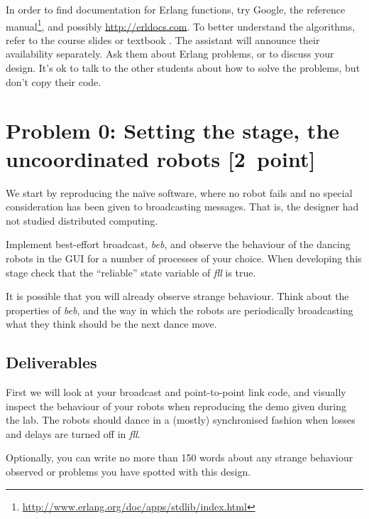 \documentclass[a4paper]{article}
\begin{document}
In order to find documentation for Erlang functions, try Google, the reference
manual\footnote{\url{http://www.erlang.org/doc/apps/stdlib/index.html}}, and
possibly \url{http://erldocs.com}.
To better understand the algorithms, refer to the course slides or textbook
\cite{cachin2011}.
The assistant will announce their availability separately. Ask them about
Erlang problems, or to discuss your design.
It's ok to talk to the other students about how to solve the problems, but
don't copy their code.







\section*{Problem 0: Setting the stage, the uncoordinated robots [2~point]} %
\label{sec:p0}

We start by reproducing the naïve software, where no robot fails and no
special consideration has been given to broadcasting messages. That is, the
designer had not studied distributed computing.

Implement best-effort broadcast, \emph{beb}, and observe the behaviour of the
dancing robots in the GUI for a number of processes of your choice.
When developing this stage check that the ``reliable'' state variable of
\emph{fll} is true.

It is possible that you will already observe strange behaviour. Think about
the properties of \emph{beb}, and the way in which the robots are periodically
broadcasting what they think should be the next dance move.

\subsection*{Deliverables} %
\label{sub:p0_deliverables}

First we will look at your broadcast and point-to-point link code, and
visually inspect the behaviour of your robots when reproducing the demo given
during the lab. The robots should dance in a (mostly) synchronised fashion
when losses and delays are turned off in \emph{fll}.

Optionally, you can write no more than 150 words about any strange behaviour
observed or problems you have spotted with this design.
\end{document}
